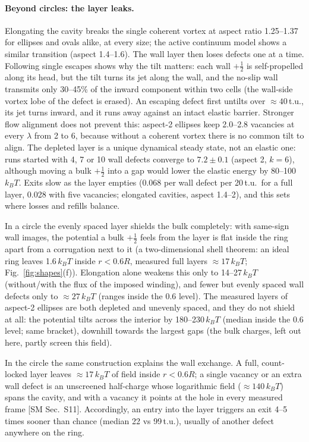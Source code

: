 \documentclass[aps,prl,twocolumn,superscriptaddress,amsmath,amssymb,reprint]{revtex4-2}
\newcommand{\half}{\tfrac12}
\newcommand{\kT}{k_BT}
\begin{document}
\paragraph*{Beyond circles: the layer leaks.} Elongating the cavity breaks the single coherent vortex at aspect ratio 1.25--1.37 for ellipses and ovals alike,
at every size; the active continuum model shows a similar transition (aspect 1.4--1.6). The wall layer then loses defects one at a time. Following single escapes shows why the
tilt matters: each wall $+\half$ is self-propelled along its head, but the tilt turns its jet along the wall, and the no-slip wall transmits only 30--45\%
of the inward component within two cells (the wall-side vortex lobe of the defect is erased). An escaping defect first untilts over $\approx40$\,t.u., its jet
turns inward, and it runs away against an intact elastic barrier. Stronger flow alignment does not prevent this: aspect-2 ellipses keep 2.0--2.8 vacancies at every
$\lambda$ from 2 to 6, because without a coherent vortex there is no common tilt to align. The depleted layer is a unique dynamical steady state, not an elastic one: runs started with 4, 7
or 10 wall defects converge to $7.2\pm0.1$ (aspect 2, $k=6$), although moving a bulk $+\half$ into a gap would lower the elastic energy by 80--100\,$\kT$. Exits slow as the
layer empties (0.068 per wall defect per 20\,t.u.\ for a full layer, 0.028 with five vacancies; elongated cavities, aspect 1.4--2), and this sets where losses and refills balance.

In a circle the evenly spaced layer shields the bulk completely: with same-sign wall images, the potential a bulk $+\half$ feels from the layer is flat
inside the ring apart from a corrugation next to it (a two-dimensional shell theorem: an ideal ring leaves 1.6\,$\kT$ inside $r<0.6R$, measured full layers $\approx17\,\kT$; Fig.~\ref{fig:shapes}(f)).
Elongation alone weakens this only to 14--27\,$\kT$ (without/with the flux of the imposed winding), and fewer but evenly spaced wall defects only to $\approx27\,\kT$ (ranges inside the 0.6 level). The measured layers of aspect-2
ellipses are both depleted and unevenly spaced, and they do not shield at all: the potential tilts across the interior by 180--230\,$\kT$ (median inside the 0.6 level; same bracket), downhill
towards the largest gaps (the bulk charges, left out here, partly screen this field).

In the circle the same construction explains the wall exchange. A full, count-locked layer leaves $\approx17\,\kT$ of field inside $r<0.6R$; a single vacancy or an
extra wall defect is an unscreened half-charge whose logarithmic field ($\approx140\,\kT$) spans the cavity, and with a vacancy it points at the hole in every
measured frame [SM Sec.~S11]. Accordingly, an entry into the layer triggers an exit 4--5 times sooner than chance (median 22 vs 99\,t.u.), usually of
another defect anywhere on the ring.
\end{document}
